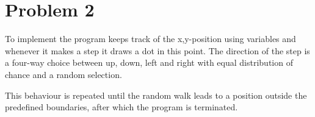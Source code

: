 \section*{Problem 2}

To implement  the program keeps track of the x,y-position
using variables and whenever it makes a step it draws a dot in this point. The
direction of the step is a four-way choice between up, down, left and right
with equal distribution of chance and a random selection.

This behaviour is repeated until the random walk leads to a position outside
the predefined boundaries, after which the program is terminated.
